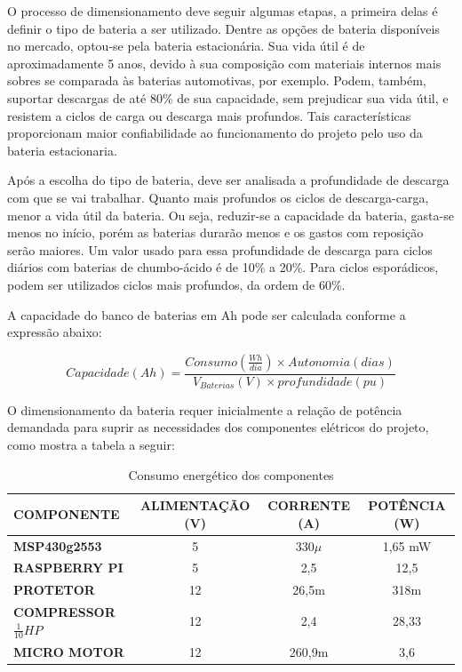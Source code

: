 	O processo de dimensionamento deve seguir algumas etapas, a primeira delas é definir o tipo de bateria a ser utilizado. Dentre as opções de bateria disponíveis no mercado, optou-se pela bateria estacionária. Sua vida útil é de aproximadamente 5 anos, devido à sua composição com materiais internos mais sobres se comparada às baterias automotivas, por exemplo. Podem, também, suportar descargas de até 80\% de sua capacidade, sem prejudicar sua vida útil, e resistem a ciclos de carga ou descarga mais profundos. Tais características proporcionam maior confiabilidade ao funcionamento do projeto pelo uso da bateria estacionaria.
	
	Após a escolha do tipo de bateria, deve ser analisada a profundidade de descarga com que se vai trabalhar. Quanto mais profundos os ciclos de descarga-carga, menor a vida útil da bateria. Ou seja, reduzir-se a capacidade da bateria, gasta-se menos no início, porém as baterias durarão menos e os gastos com reposição serão maiores. Um valor usado para essa profundidade de descarga para ciclos diários com baterias de chumbo-ácido é de 10\% a 20\%. Para ciclos esporádicos, podem ser utilizados ciclos mais profundos, da ordem de 60\%. 
	
	A capacidade do banco de baterias em Ah pode ser calculada conforme a expressão abaixo: 
	
	\begin{equation}
	Capacidade(Ah) = \frac{Consumo(\frac{Wh}{dia}) \times Autonomia(dias)}{V_{Baterias}(V)\times profundidade(pu)}
	\end{equation}

O dimensionamento da bateria requer inicialmente a relação de potência demandada para suprir as necessidades dos componentes elétricos do projeto, como mostra a tabela a seguir:

\begin{table}[H]
\caption{Consumo energético dos componentes}
\begin{tabular}{|p{4 cm} |c |c |c |}
 \hline
   \textbf{COMPONENTE} &\textbf{ALIMENTAÇÃO (V)}  &\textbf{CORRENTE (A)} & \textbf{POTÊNCIA (W)} \\
   \hline
  \textbf{MSP430g2553} &5 & 330$\mu$& 1,65 mW \\
   \hline
   \textbf{RASPBERRY PI}&5 &2,5 & 12,5 \\
   \hline
  \textbf{PROTETOR } &12 &26,5m &318m \\
   \hline
  \textbf{COMPRESSOR $\frac{1}{10}HP$} &12 & 2,4& 28,33 \\
   \hline
  \textbf{MICRO MOTOR} &12 &260,9m &3,6  \\
   \hline

\end{tabular}
\end{table}

